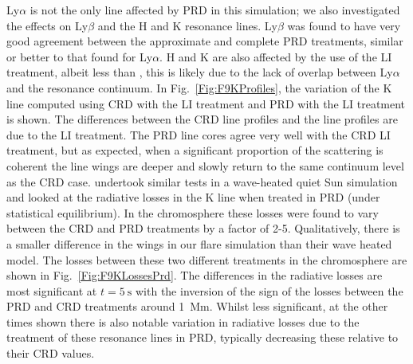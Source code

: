 Ly$\alpha$ is not the only line affected by PRD in this simulation; we also investigated the effects on Ly$\beta$ and the \Caii{} H and K resonance lines.
Ly$\beta$ was found to have very good agreement between the approximate and complete PRD treatments, similar or better to that found for Ly$\alpha$.
\Caii{} H and K are also affected by the use of the LI treatment, albeit less than \CaLine{}, this is likely due to the lack of overlap between Ly$\alpha$ and the \Caii{} resonance continuum.
In Fig.~\ref{Fig:F9KProfiles}, the variation of the \Caii{} K line computed using CRD with the LI treatment and PRD with the LI treatment is shown.
The differences between the CRD line profiles and the \Radyn{} line profiles are due to the LI treatment.
The PRD line cores agree very well with the CRD LI treatment, but as expected, when a significant proportion of the scattering is coherent the line wings are deeper and slowly return to the same continuum level as the CRD case.
\citet{Uitenbroek2002} undertook similar tests in a wave-heated quiet Sun \Radyn{} simulation and looked at the radiative losses in the \Caii{} K line when treated in PRD (under statistical equilibrium).
In the chromosphere these losses were found to vary between the CRD and PRD treatments by a factor of 2-5.
Qualitatively, there is a smaller difference in the \Caii{} wings in our flare simulation than their wave heated model.
The losses between these two different treatments in the chromosphere are shown in Fig.~\ref{Fig:F9KLossesPrd}.
The differences in the radiative losses are most significant at $t=\SI{5}{\second}$ with the inversion of the sign of the losses between the PRD and CRD treatments around \SI{1}{\mega\metre}.
Whilst less significant, at the other times shown there is also notable variation in radiative losses due to the treatment of these \Caii{} resonance lines in PRD, typically decreasing these relative to their CRD values.

